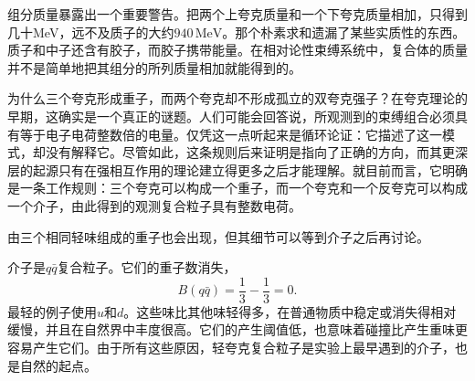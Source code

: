 组分质量暴露出一个重要警告。把两个上夸克质量和一个下夸克质量相加，只得到几十MeV，远不及质子的大约\(940\,\mathrm{MeV}\)。那个朴素求和遗漏了某些实质性的东西。质子和中子还含有胶子，而胶子携带能量。在相对论性束缚系统中，复合体的质量并不是简单地把其组分的所列质量相加就能得到的。

\begin{classroomqa}
\end{classroomqa}

\begin{classroomqa}
\end{classroomqa}

\begin{classroomqa}
\end{classroomqa}

\begin{classroomqa}
\end{classroomqa}

为什么三个夸克形成重子，而两个夸克却不形成孤立的双夸克强子？在夸克理论的早期，这确实是一个真正的谜题。人们可能会回答说，所观测到的束缚组合必须具有等于电子电荷整数倍的电量。仅凭这一点听起来是循环论证：它描述了这一模式，却没有解释它。尽管如此，这条规则后来证明是指向了正确的方向，而其更深层的起源只有在强相互作用的理论建立得更多之后才能理解。就目前而言，它明确是一条工作规则：三个夸克可以构成一个重子，而一个夸克和一个反夸克可以构成一个介子，由此得到的观测复合粒子具有整数电荷。

由三个相同轻味组成的重子也会出现，但其细节可以等到介子之后再讨论。

介子是\(q\bar q\)复合粒子。它们的重子数消失，
\begin{equation}
B(q\bar q)=\frac13-\frac13=0.
\end{equation}
最轻的例子使用\(u\)和\(d\)。这些味比其他味轻得多，在普通物质中稳定或消失得相对缓慢，并且在自然界中丰度很高。它们的产生阈值低，也意味着碰撞比产生重味更容易产生它们。由于所有这些原因，轻夸克复合粒子是实验上最早遇到的介子，也是自然的起点。

